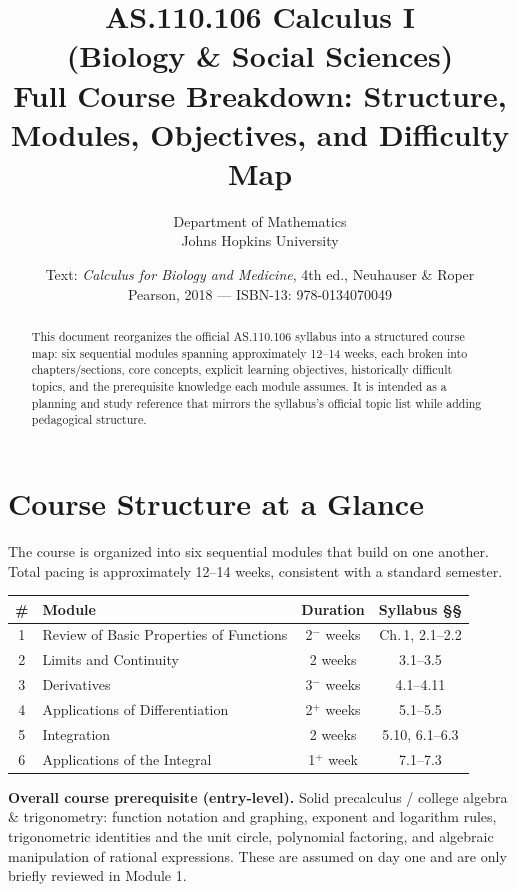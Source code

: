 \documentclass[11pt]{article}
\title{\vspace{-1.5cm}\textcolor{jhublue}{\Huge\bfseries AS.110.106 Calculus I}\\[4pt]
\Large (Biology \& Social Sciences)\\[2pt]
\large Full Course Breakdown: Structure, Modules, Objectives, and Difficulty Map}
\author{Department of Mathematics \\ Johns Hopkins University}
\date{Text: \emph{Calculus for Biology and Medicine}, 4th ed., Neuhauser \& Roper \\ Pearson, 2018 --- ISBN-13: 978-0134070049}
\begin{document}
\maketitle
\thispagestyle{empty}

\begin{abstract}
\noindent This document reorganizes the official AS.110.106 syllabus into a structured
course map: six sequential modules spanning approximately 12--14 weeks, each broken into
chapters/sections, core concepts, explicit learning objectives, historically difficult
topics, and the prerequisite knowledge each module assumes. It is intended as a planning
and study reference that mirrors the syllabus's official topic list while adding
pedagogical structure.
\end{abstract}

\tableofcontents
\vspace{0.5cm}

\section{Course Structure at a Glance}

The course is organized into six sequential modules that build on one another. Total
pacing is approximately 12--14 weeks, consistent with a standard semester.

\begin{center}
\renewcommand{\arraystretch}{1.3}
\begin{longtable}{@{}c l c c@{}}
\toprule
\textbf{\#} & \textbf{Module} & \textbf{Duration} & \textbf{Syllabus \S\S} \\
\midrule
\endhead
1 & Review of Basic Properties of Functions & 2$^-$ weeks & Ch.\,1, 2.1--2.2 \\
2 & Limits and Continuity & 2 weeks & 3.1--3.5 \\
3 & Derivatives & 3$^-$ weeks & 4.1--4.11 \\
4 & Applications of Differentiation & 2$^+$ weeks & 5.1--5.5 \\
5 & Integration & 2 weeks & 5.10, 6.1--6.3 \\
6 & Applications of the Integral & 1$^+$ week & 7.1--7.3 \\
\bottomrule
\end{longtable}
\end{center}

\noindent\textbf{Overall course prerequisite (entry-level).} Solid precalculus /
college algebra \& trigonometry: function notation and graphing, exponent and
logarithm rules, trigonometric identities and the unit circle, polynomial
factoring, and algebraic manipulation of rational expressions. These are assumed
on day one and are only briefly reviewed in Module 1.
\end{document}
